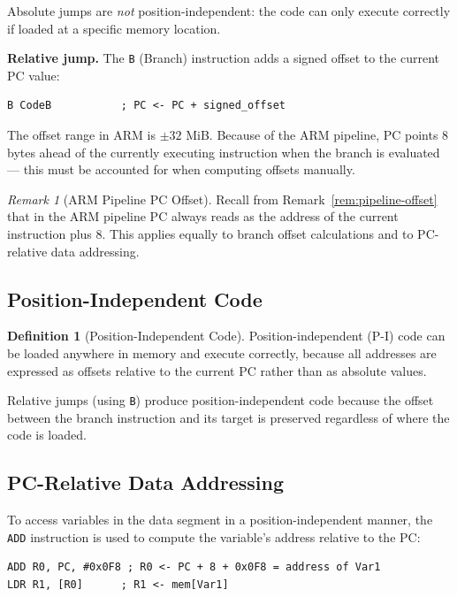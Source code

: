 \documentclass[11pt, a4paper, notitlepage]{report}
\theoremstyle{definition}
\newtheorem{definition}[theorem]{Definition}
\theoremstyle{remark}
\newtheorem{remark}[theorem]{Remark}
\theoremstyle{definition}
\begin{document}
Absolute jumps are \emph{not} position-independent: the code can only execute correctly if loaded at a specific memory location.

\textbf{Relative jump.} The \texttt{B} (Branch) instruction adds a signed offset to the current PC value:

\begin{lstlisting}
B CodeB           ; PC <- PC + signed_offset
\end{lstlisting}

The offset range in ARM is $\pm 32$ MiB\@. Because of the ARM pipeline, PC points 8 bytes ahead of the currently executing instruction when the branch is evaluated --- this must be accounted for when computing offsets manually.

\begin{remark}[ARM Pipeline PC Offset]
Recall from Remark~\ref{rem:pipeline-offset} that in the ARM pipeline PC always reads as the address of the current instruction plus 8. This applies equally to branch offset calculations and to PC-relative data addressing.
\end{remark}

\subsection{Position-Independent Code}

\begin{definition}[Position-Independent Code]
\label{def:pic}
Position-independent (P-I) code can be loaded anywhere in memory and execute correctly, because all addresses are expressed as offsets relative to the current PC rather than as absolute values.
\end{definition}

Relative jumps (using \texttt{B}) produce position-independent code because the offset between the branch instruction and its target is preserved regardless of where the code is loaded.

\subsection{PC-Relative Data Addressing}

To access variables in the data segment in a position-independent manner, the \texttt{ADD} instruction is used to compute the variable's address relative to the PC:

\begin{lstlisting}
ADD R0, PC, #0x0F8 ; R0 <- PC + 8 + 0x0F8 = address of Var1
LDR R1, [R0]      ; R1 <- mem[Var1]
\end{lstlisting}
\end{document}
